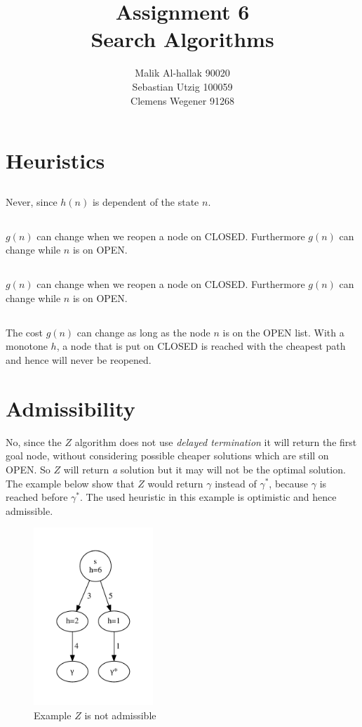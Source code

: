 \documentclass[11pt]{article}
\title{\textbf{Assignment 6\\}Search Algorithms}
\author{Malik Al-hallak 90020\\
		Sebastian Utzig 100059\\
		Clemens Wegener 91268}
\date{}
\begin{document}
\maketitle

\section{Heuristics}
\subsection{}
Never, since $h(n)$ is dependent of the state $n$. 
\subsection{}
$g(n)$ can change when we reopen a node on CLOSED. Furthermore $g(n)$ can change while $n$ is on OPEN.
\subsection{}
$g(n)$ can change when we reopen a node on CLOSED. Furthermore $g(n)$ can change while $n$ is on OPEN.
\subsection{}
The cost $g(n)$ can change as long as the node $n$ is on the OPEN list. With a monotone $h$, a node that is put on CLOSED is reached with the cheapest path and hence will never be reopened.
\section{Admissibility}
No, since the $Z$ algorithm does not use \emph{delayed termination} it will return the first goal node, without considering possible cheaper solutions which are still on OPEN. So $Z$ will return \emph{a} solution but it may will not be the optimal solution. The example below show that $Z$ would return $\gamma$ instead of $\gamma^*$, because $\gamma$ is reached before $\gamma^*$. The used heuristic in this example is optimistic and hence admissible.

\begin{figure}[H]
	\centering
  \includegraphics[width=0.4\textwidth]{./graph.pdf}
  \caption{Example $Z$ is not admissible}
	\label{fig2}
\end{figure}
\end{document}
